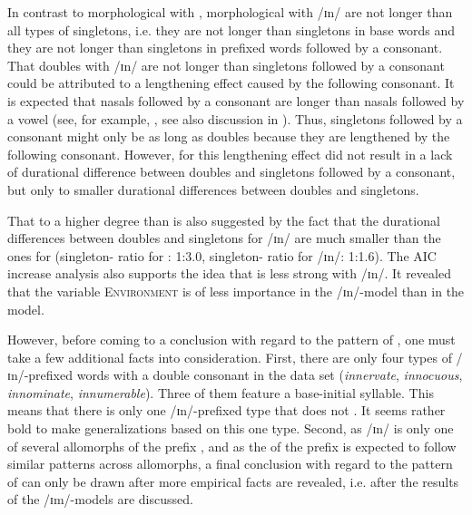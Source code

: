 In contrast to morphological  with , 
morphological  with /ɪn/ are not longer than all types of singletons, i.e. they are not longer than singletons in base words and they are not longer than singletons in prefixed words followed by a consonant. 
That doubles with /ɪn/ are not longer than singletons followed by a consonant could be attributed to a lengthening effect caused by the following consonant.
It is expected that nasals followed by a consonant are longer than nasals followed by a vowel (see, for example, \citealt{Umeda.1977}, see also discussion in ).  Thus, singletons followed by a consonant might only be as long as doubles because they are lengthened by the following consonant. However, for  this lengthening effect did not result in a lack of durational difference between doubles and singletons followed by a consonant, but only to smaller durational differences between doubles and singletons.  

That   to a higher degree than  is also suggested by the fact that the durational differences between doubles and singletons for /ɪn/ are much smaller than the ones for  (singleton- ratio for : 1:3.0, singleton- ratio for /ɪn/: 1:1.6). 
The AIC increase analysis also supports the idea that  is less strong with /ɪn/. It revealed that the variable \textsc{Environment} is of less importance in the /ɪn/-model than in the model.




However, before coming to a conclusion with regard to the  pattern of , one must take a few additional facts into consideration. 
First, there are only four types of /ɪn/-prefixed words with a double consonant in the data set (\textit{innervate}, \textit{innocuous}, \textit{innominate}, \textit{innumerable}). Three of them feature a  base-initial syllable. This means that there is only one /ɪn/-prefixed type that does not . It seems rather bold to make generalizations based on this one type. 
Second, as /ɪn/ is only one of several allomorphs of the prefix , and as the  of the prefix  is expected to follow similar patterns across allomorphs, 
a final conclusion with regard to the  pattern of  can only be drawn after more empirical facts are revealed, i.e. after the results of the /ɪm/-models are discussed.
%


